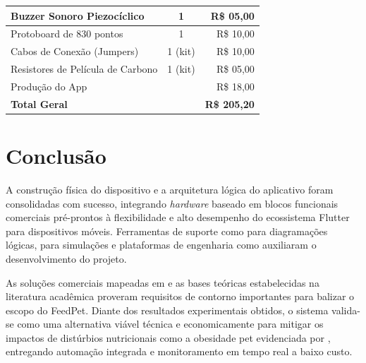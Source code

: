 \documentclass[12pt]{article}\usepackage{sbc-template}\usepackage{graphicx,url}\usepackage[utf8]{inputenc}
\begin{document}
\begin{table}[ht]
\begin{tabular}{|l|c|r|}
    Buzzer Sonoro Piezocíclico                     & 1                         & R\$ 05,00                 \\ \hline
    Protoboard de 830 pontos                       & 1                         & R\$ 10,00                 \\ \hline
    Cabos de Conexão (Jumpers)                     & 1 (kit)                   & R\$ 10,00                 \\ \hline
    Resistores de Película de Carbono              & 1 (kit)                   & R\$ 05,00                 \\ \hline
    Produção do App				& \multicolumn{2}{|r|}{R\$ 18,00}		\\ \hline
    \multicolumn{2}{|l|}{\textbf{Total Geral}}                                 & \textbf{R\$ 205,20}       \\ \hline
    \end{tabular}
\end{table}

\section{Conclusão}

A construção física do dispositivo e a arquitetura lógica do aplicativo foram consolidadas com sucesso, integrando \textit{hardware} baseado em blocos funcionais comerciais pré-prontos à flexibilidade e alto desempenho do ecossistema Flutter para dispositivos móveis. Ferramentas de suporte como \cite{mermaid:26} para diagramações lógicas, \cite{tinkercad:23} para simulações e plataformas de engenharia como \cite{blueoprint:26} auxiliaram o desenvolvimento do projeto.

As soluções comerciais mapeadas em \cite{onizoomi:26, surecare:26} e as bases teóricas estabelecidas na literatura acadêmica \cite{alves:20} proveram requisitos de contorno importantes para balizar o escopo do FeedPet. Diante dos resultados experimentais obtidos, o sistema valida-se como uma alternativa viável técnica e economicamente para mitigar os impactos de distúrbios nutricionais como a obesidade pet evidenciada por \cite{folha:23}, entregando automação integrada e monitoramento em tempo real a baixo custo.
\end{document}
